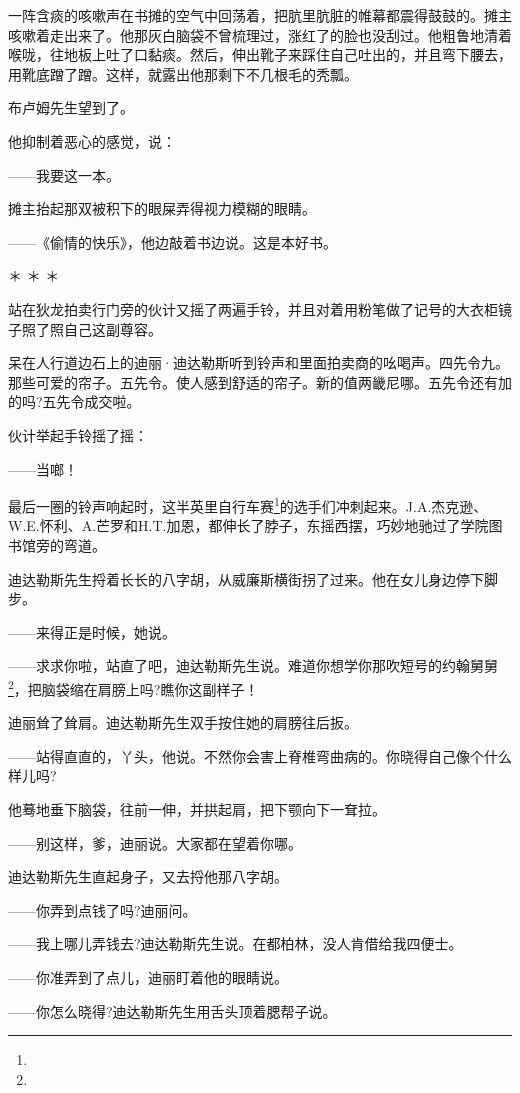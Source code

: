 \par 一阵含痰的咳嗽声在书摊的空气中回荡着，把肮里肮脏的帷幕都震得鼓鼓的。摊主咳嗽着走出来了。他那灰白脑袋不曾梳理过，涨红了的脸也没刮过。他粗鲁地清着喉咙，往地板上吐了口黏痰。然后，伸出靴子来踩住自己吐出的，并且弯下腰去，用靴底蹭了蹭。这样，就露出他那剩下不几根毛的秃瓢。
\par 布卢姆先生望到了。
\par 他抑制着恶心的感觉，说：
\par ——我要这一本。
\par 摊主抬起那双被积下的眼屎弄得视力模糊的眼睛。
\par ——《偷情的快乐》，他边敲着书边说。这是本好书。
\par ＊ ＊ ＊
\par 站在狄龙拍卖行门旁的伙计又摇了两遍手铃，并且对着用粉笔做了记号的大衣柜镜子照了照自己这副尊容。
\par 呆在人行道边石上的迪丽·迪达勒斯听到铃声和里面拍卖商的吆喝声。四先令九。那些可爱的帘子。五先令。使人感到舒适的帘子。新的值两畿尼哪。五先令还有加的吗?五先令成交啦。
\par 伙计举起手铃摇了摇：
\par ——当啷！
\par 最后一圈的铃声响起时，这半英里自行车赛\footnote{}的选手们冲刺起来。J.A.杰克逊、W.E.怀利、A.芒罗和H.T.加恩，都伸长了脖子，东摇西摆，巧妙地驰过了学院图书馆旁的弯道。
\par 迪达勒斯先生捋着长长的八字胡，从威廉斯横街拐了过来。他在女儿身边停下脚步。
\par ——来得正是时候，她说。
\par ——求求你啦，站直了吧，迪达勒斯先生说。难道你想学你那吹短号的约翰舅舅\footnote{}，把脑袋缩在肩膀上吗?瞧你这副样子！
\par 迪丽耸了耸肩。迪达勒斯先生双手按住她的肩膀往后扳。
\par ——站得直直的，丫头，他说。不然你会害上脊椎弯曲病的。你晓得自己像个什么样儿吗?
\par 他蓦地垂下脑袋，往前一伸，并拱起肩，把下颚向下一耷拉。
\par ——别这样，爹，迪丽说。大家都在望着你哪。
\par 迪达勒斯先生直起身子，又去捋他那八字胡。
\par ——你弄到点钱了吗?迪丽问。
\par ——我上哪儿弄钱去?迪达勒斯先生说。在都柏林，没人肯借给我四便士。
\par ——你准弄到了点儿，迪丽盯着他的眼睛说。
\par ——你怎么晓得?迪达勒斯先生用舌头顶着腮帮子说。
